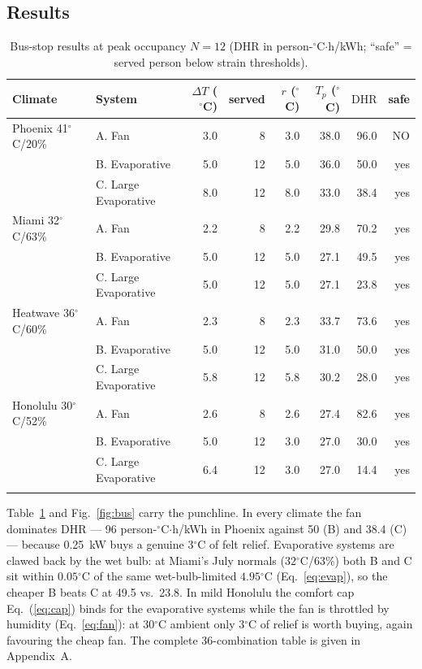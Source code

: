 \documentclass[11pt]{article}
\newcommand{\degrees}{\ensuremath{^\circ}}
\newcommand{\DHR}{\text{DHR}}
\begin{document}
\subsection{Results}
\begin{table}[H]\centering\footnotesize
\caption{Bus-stop results at peak occupancy $N=12$ ($\DHR$ in person-$\degrees$C$\cdot$h/kWh; ``safe'' = served person below strain thresholds).}\label{tab:bus}
\begin{tabular}{@{}llrrrrrr@{}}
\toprule
Climate & System & $\Delta T$ (\degrees C) & served & $r$ (\degrees C) & $T_p$ (\degrees C) & $\DHR$ & safe\\
\midrule
Phoenix 41\degrees C/20\% & A. Fan & 3.0 & 8 & 3.0 & 38.0 & 96.0 & NO \\
 & B. Evaporative & 5.0 & 12 & 5.0 & 36.0 & 50.0 & yes \\
 & C. Large Evaporative & 8.0 & 12 & 8.0 & 33.0 & 38.4 & yes \\
\addlinespace
Miami 32\degrees C/63\% & A. Fan & 2.2 & 8 & 2.2 & 29.8 & 70.2 & yes \\
 & B. Evaporative & 5.0 & 12 & 5.0 & 27.1 & 49.5 & yes \\
 & C. Large Evaporative & 5.0 & 12 & 5.0 & 27.1 & 23.8 & yes \\
\addlinespace
Heatwave 36\degrees C/60\% & A. Fan & 2.3 & 8 & 2.3 & 33.7 & 73.6 & yes \\
 & B. Evaporative & 5.0 & 12 & 5.0 & 31.0 & 50.0 & yes \\
 & C. Large Evaporative & 5.8 & 12 & 5.8 & 30.2 & 28.0 & yes \\
\addlinespace
Honolulu 30\degrees C/52\% & A. Fan & 2.6 & 8 & 2.6 & 27.4 & 82.6 & yes \\
 & B. Evaporative & 5.0 & 12 & 3.0 & 27.0 & 30.0 & yes \\
 & C. Large Evaporative & 6.4 & 12 & 3.0 & 27.0 & 14.4 & yes \\
\addlinespace
\bottomrule
\end{tabular}
\end{table}

Table~\ref{tab:bus} and Fig.~\ref{fig:bus} carry the punchline. In every climate the fan dominates $\DHR$ --- 96 person-$\degrees$C$\cdot$h/kWh in Phoenix against 50 (B) and 38.4 (C) --- because 0.25~kW buys a genuine $3\degrees$C of felt relief. Evaporative systems are clawed back by the wet bulb: at Miami's July normals ($32\degrees$C/63\%) both B and C sit within $0.05\degrees$C of the same wet-bulb-limited $4.95\degrees$C (Eq.~\ref{eq:evap}), so the cheaper B beats C at 49.5 vs.\ 23.8. In mild Honolulu the comfort cap Eq.~(\ref{eq:cap}) binds for the evaporative systems while the fan is throttled by humidity (Eq.~\ref{eq:fan}): at $30\degrees$C ambient only $3\degrees$C of relief is worth buying, again favouring the cheap fan. The complete 36-combination table is given in Appendix~A.
\end{document}

